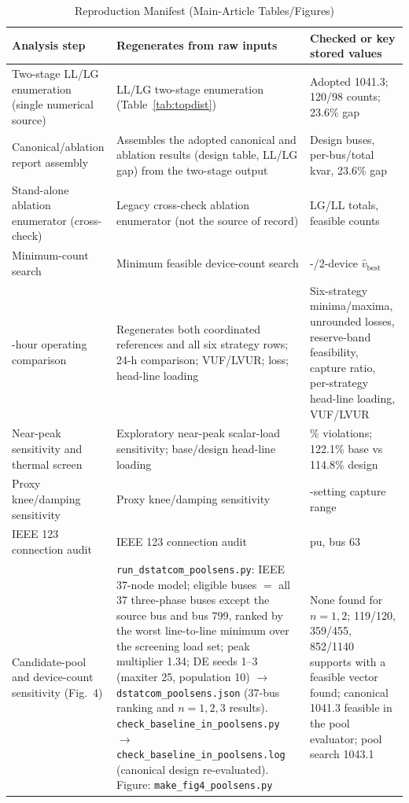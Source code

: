 \documentclass[journal]{IEEEtran}
\newcommand{\kvar}{\text{kvar}}
\begin{document}
\begin{table}[!t]
\setcounter{table}{3}
\caption{Reproduction Manifest (Main-Article Tables/Figures)}
\label{tab:manifest}
\centering
\renewcommand{\arraystretch}{1.3}
\setlength{\tabcolsep}{4pt}
\scriptsize
\begin{tabular}{@{}>{\scriptsize\raggedright\arraybackslash}p{} >{\raggedright\arraybackslash}p{} >{\raggedright\arraybackslash}p{}@{}}
\toprule
\textbf{Analysis step} & \textbf{Regenerates from raw inputs} & \textbf{Checked or key stored values} \\
\midrule
Two-stage LL/LG enumeration (single numerical source) & LL/LG two-stage enumeration (Table~\ref{tab:topdist}) & Adopted \SI{1041.3}{\kvar}; 120/98 counts; 23.6\% gap \\
Canonical/ablation report assembly & Assembles the adopted canonical and ablation results (design table, LL/LG gap) from the two-stage output & Design buses, per-bus/total kvar, 23.6\% gap \\
Stand-alone ablation enumerator (cross-check) & Legacy cross-check ablation enumerator (not the source of record) & LG/LL totals, feasible counts \\
Minimum-count search & Minimum feasible device-count search & 1-/2-device $\hat v_{\mathrm{best}}$ \\
24-hour operating comparison & Regenerates both coordinated references and all six strategy rows; 24-h comparison; VUF/LVUR; loss; head-line loading & Six-strategy minima/maxima, unrounded losses, reserve-band feasibility, capture ratio, per-strategy head-line loading, VUF/LVUR \\
Near-peak sensitivity and thermal screen & Exploratory near-peak scalar-load sensitivity; base/design head-line loading & 7\% violations; 122.1\% base vs 114.8\% design \\
Proxy knee/damping sensitivity & Proxy knee/damping sensitivity & 27-setting capture range \\
IEEE 123 connection audit & IEEE 123 connection audit & 0.9657 pu, bus 63 \\
Candidate-pool and device-count sensitivity (Fig.~4) & \texttt{run\_dstatcom\_poolsens.py}: IEEE 37-node model; eligible buses $=$ all 37 three-phase buses except the source bus and bus 799, ranked by the worst line-to-line minimum over the screening load set; peak multiplier 1.34; DE seeds 1--3 (maxiter 25, population 10) $\rightarrow$ \texttt{dstatcom\_poolsens.json} (37-bus ranking and $n=1,2,3$ results). \texttt{check\_baseline\_in\_poolsens.py} $\rightarrow$ \texttt{check\_baseline\_in\_poolsens.log} (canonical design re-evaluated). Figure: \texttt{make\_fig4\_poolsens.py} & None found for $n=1,2$; 119/120, 359/455, 852/1140 supports with a feasible vector found; canonical \SI{1041.3}{\kvar} feasible in the pool evaluator; pool search \SI{1043.1}{\kvar} \\

\end{tabular}
\end{table}
\end{document}
